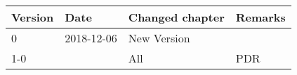 \begin{longtable}{|p{1.5cm}|p{2cm}|p{6cm}|p{3cm}|}\hline
\centering
\textbf{Version} & \textbf{Date}       & \textbf{Changed chapter}   & \textbf{Remarks}  \\\hline
0       & 2018-12-06 & New Version   &          \\
1-0     &  &  All         & PDR                             \\ \hline
\end{longtable}           